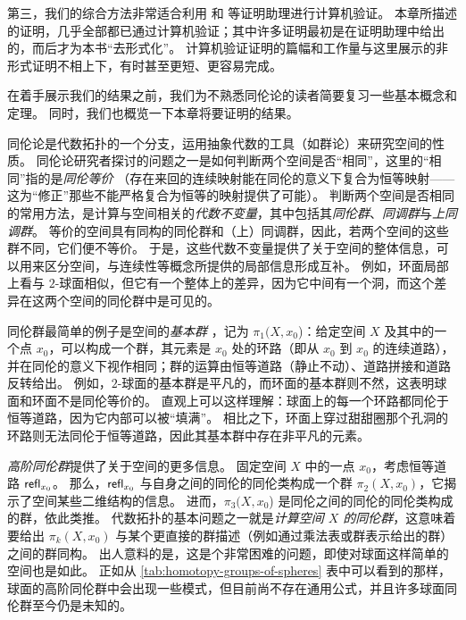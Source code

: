 %
%
第三，我们的综合方法非常适合利用 \Coq 和 \Agda 等证明助理进行计算机验证。
本章所描述的证明，几乎全部都已通过计算机验证；其中许多证明最初是在证明助理中给出的，而后才为本书``去形式化''。
计算机验证证明的篇幅和工作量与这里展示的非形式证明不相上下，有时甚至更短、更容易完成。

\mentalpause

在着手展示我们的结果之前，我们为不熟悉同伦论的读者简要复习一些基本概念和定理。
同时，我们也概览一下本章将要证明的结果。

%
同伦论是代数拓扑的一个分支，运用抽象代数的工具（如群论）来研究空间的性质。
同伦论研究者探讨的问题之一是如何判断两个空间是否``相同''，这里的``相同''指的是\emph{同伦等价}
%
（存在来回的连续映射能在同伦的意义下复合为恒等映射——这为``修正''那些不能严格复合为恒等的映射提供了可能）。
判断两个空间是否相同的常用方法，是计算与空间相关的\emph{代数不变量}，其中包括其\emph{同伦群}、\emph{同调群}与\emph{上同调群}。
%
%
等价的空间具有同构的同伦群和（上）同调群，因此，若两个空间的这些群不同，它们便不等价。
于是，这些代数不变量提供了关于空间的整体信息，可以用来区分空间，与连续性等概念所提供的局部信息形成互补。
例如，环面局部上看与 $2$-球面相似，但它有一个整体上的差异，因为它中间有一个洞，而这个差异在这两个空间的同伦群中是可见的。

同伦群最简单的例子是空间的\emph{基本群}
%
，记为 $\pi_1(X,x_0$)：给定空间 $X$ 及其中的一个点 $x_0$，可以构成一个群，其元素是 $x_0$ 处的环路（即从 $x_0$ 到 $x_0$ 的连续道路），并在同伦的意义下视作相同；群的运算由恒等道路（静止不动）、道路拼接和道路反转给出。
例如，$2$-球面的基本群是平凡的，而环面的基本群则不然，这表明球面和环面不是同伦等价的。
直观上可以这样理解：球面上的每一个环路都同伦于恒等道路，因为它内部可以被``填满''。
相比之下，环面上穿过甜甜圈那个孔洞的环路则无法同伦于恒等道路，因此其基本群中存在非平凡的元素。

\emph{高阶同伦群}提供了关于空间的更多信息。
固定空间 $X$ 中的一点 $x_0$，考虑恒等道路 $\mathsf{refl}_{x_0}$。
那么，$\mathsf{refl}_{x_0}$ 与自身之间的同伦的同伦类构成一个群 $\pi_2(X,x_0)$，它揭示了空间某些二维结构的信息。
进而，$\pi_3(X,x_0$) 是同伦之间的同伦的同伦类构成的群，依此类推。
代数拓扑的基本问题之一就是\emph{计算空间 $X$ 的同伦群}，这意味着要给出 $\pi_k(X,x_0)$ 与某个更直接的群描述（例如通过乘法表或群表示给出的群）之间的群同构。
出人意料的是，这是个非常困难的问题，即使对球面这样简单的空间也是如此。
正如从 \cref{tab:homotopy-groups-of-spheres} 表中可以看到的那样，球面的高阶同伦群中会出现一些模式，但目前尚不存在通用公式，并且许多球面同伦群至今仍是未知的。

